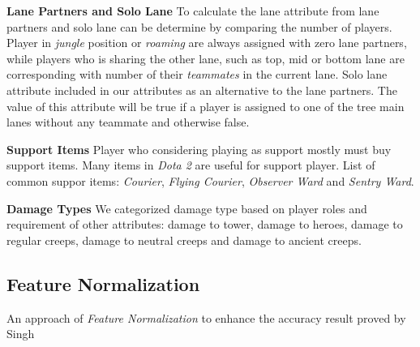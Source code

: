 \textbf{Lane Partners and Solo Lane} To calculate the lane attribute from lane partners and solo lane can be determine by comparing the number of players. Player in \textit{jungle} position or \textit{roaming} are always assigned with zero lane partners, while players who is sharing the other lane, such as top, mid or bottom lane are corresponding with number of their \textit{teammates} in the current lane. Solo lane attribute included in our attributes as an alternative to the lane partners. The value of this attribute will be true if a player is assigned to one of the tree main lanes without any teammate and otherwise false.

\textbf{Support Items} Player who considering playing as support mostly must buy support items. Many items in \textit{Dota 2} are useful for support player. List of common suppor items: \textit{Courier}, \textit{Flying Courier}, \textit{Observer Ward} and \textit{Sentry Ward}. 

\textbf{Damage Types} We categorized damage type based on player roles and requirement of other attributes: damage to tower, damage to heroes, damage to regular creeps, damage to neutral creeps and damage to ancient creeps.

\subsection{Feature Normalization}
\label{sec:featurenorm}

An approach of \textit{Feature Normalization} to enhance the accuracy result proved by Singh \cite{singh2015investigations}